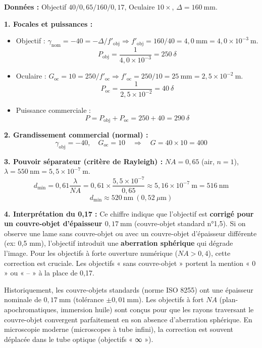 \documentclass[11pt]{article}
\begin{document}
\begin{exoresolu}
\textbf{Données :} Objectif $40/0,65/160/0,17$, Oculaire $10\times$, $\Delta = 160\ \text{mm}$.

\textbf{1. Focales et puissances :}
\begin{itemize}
    \item Objectif : $\gamma_{\text{nom}} = -40 = -\Delta/f'_{\text{obj}} \Rightarrow f'_{\text{obj}} = 160/40 = 4,0\ \text{mm} = 4,0 \times 10^{-3}\ \text{m}$.
    \[
    P_{\text{obj}} = \frac{1}{4,0 \times 10^{-3}} = 250\ \delta
    \]
    \item Oculaire : $G_{\text{oc}} = 10 = 250/f'_{\text{oc}} \Rightarrow f'_{\text{oc}} = 250/10 = 25\ \text{mm} = 2,5 \times 10^{-2}\ \text{m}$.
    \[
    P_{\text{oc}} = \frac{1}{2,5 \times 10^{-2}} = 40\ \delta
    \]
    \item Puissance commerciale :
    \[
    \boxed{P = P_{\text{obj}} + P_{\text{oc}} = 250 + 40 = 290\ \delta}
    \]
\end{itemize}

\textbf{2. Grandissement commercial (normal) :}
\[
\gamma_{\text{obj}} = -40,\quad G_{\text{oc}} = 10 \quad \Rightarrow \quad \boxed{G = 40 \times 10 = 400}
\]

\textbf{3. Pouvoir séparateur (critère de Rayleigh) :}
$NA = 0,65$ (air, $n=1$), $\lambda = 550\ \text{nm} = 5,5 \times 10^{-7}\ \text{m}$.
\[
d_{\text{min}} = 0,61 \frac{\lambda}{NA} = 0,61 \times \frac{5,5 \times 10^{-7}}{0,65} \approx 5,16 \times 10^{-7}\ \text{m} = 516\ \text{nm}
\]
\[
\boxed{d_{\text{min}} \approx 520\ \text{nm} \ (0,52\ \mu\text{m})}
\]

\textbf{4. Interprétation du 0,17 :}
Ce chiffre indique que l'objectif est \textbf{corrigé pour un couvre-objet d'épaisseur $0,17\ \text{mm}$} (couvre-objet standard n°1,5). Si on observe une lame sans couvre-objet ou avec un couvre-objet d'épaisseur différente (ex: 0,5 mm), l'objectif introduit une \textbf{aberration sphérique} qui dégrade l'image. Pour les objectifs à forte ouverture numérique ($NA > 0,4$), cette correction est cruciale. Les objectifs « sans couvre-objet » portent la mention « 0 » ou « – » à la place de 0,17.
\end{exoresolu}

\begin{savaistu}
Historiquement, les couvre-objets standards (norme ISO 8255) ont une épaisseur nominale de $0,17\ \text{mm}$ (tolérance $\pm 0,01\ \text{mm}$). Les objectifs à fort $NA$ (plan-apochromatiques, immersion huile) sont conçus pour que les rayons traversant le couvre-objet convergent parfaitement en son absence d'aberration sphérique. En microscopie moderne (microscopes à tube infini), la correction est souvent déplacée dans le tube optique (objectifs « ∞ »).
\end{savaistu}
\end{document}
